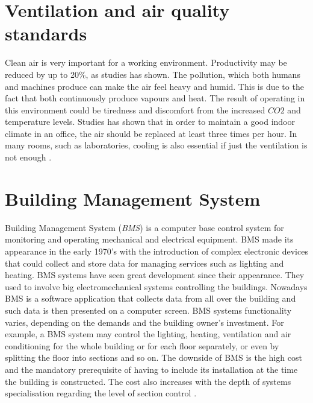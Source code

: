 \documentclass[12pt,a4paper,draft]{report}
\begin{document}
\section {Ventilation and air quality standards}
Clean air is very important for a working environment. Productivity may be reduced by up to 20\%, as studies has shown. The pollution, which both humans and machines produce can make the air feel heavy and humid. This is due to the fact that both continuously produce vapours and heat. The result of operating in this environment could be tiredness and discomfort from the increased $CO2$ and temperature levels. Studies has shown that in order to maintain a good indoor climate in an office, the air should be replaced at least three times per hour. In many rooms, such as laboratories, cooling is also essential if just the ventilation is not enough \cite{website:ventilation}.
%
\section{Building Management System}
Building Management System (\textit{BMS}) is a computer base control system for monitoring and operating mechanical and electrical equipment.
BMS made its appearance in the early 1970's with the introduction of complex electronic devices that could collect and store data for managing services such as lighting and heating. BMS systems have seen great development since their appearance.
They used to involve big electromechanical systems controlling the buildings.
Nowadays BMS is a software application that collects data from all over the building and such data is then presented on a computer screen.
BMS systems functionality varies, depending on the demands and the building owner's investment.
For example, a BMS system may control the lighting, heating, ventilation and air conditioning for the whole building or for each floor separately, or even by splitting the floor into sections and so on.
The downside of BMS is the high cost and the mandatory prerequisite of having to include its installation at the time the building is constructed.
The cost also increases with the depth of systems specialisation regarding the level of section control \cite{website:bms}.
%
\end{document}
